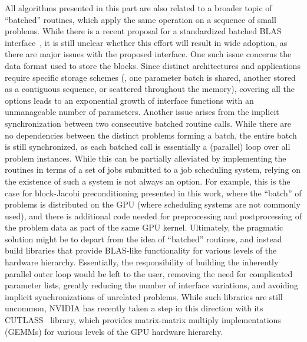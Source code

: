 All algorithms presented in this part are also related to a broader topic of
``batched'' routines, which apply the same operation on a sequence of small
problems. While there is a recent proposal for a standardized batched BLAS
interface~\cite{batched-blas}, it is still unclear whether this effort will result in
wide adoption, as there are major issues with the proposed interface.
One such issue concerns the data format used to store the blocks. Since distinct
architectures and applications require specific storage schemes (\eg, one
parameter batch is shared, another stored as a contiguous sequence, or scattered
throughout the memory), covering all the options leads to an exponential
growth of interface functions with an unmanageable number of parameters.
Another issue arises from the implicit synchronization between two consecutive
batched routine calls. While there are no dependencies between the distinct
problems forming a batch, the entire batch is still synchronized, as each
batched call is essentially a (parallel) loop over all problem instances. While
this can be partially alleviated by implementing the routines in terms of a set
of jobs submitted to a job scheduling system, relying on the existence of such a
system is not always an option. For example, this is the case for block-Jacobi
preconditioning presented in this work, where the ``batch'' of problems is
distributed on the GPU (where scheduling systems are not commonly used), and
there is additional code needed for preprocessing and postprocessing of the
problem data as part of the same GPU kernel. Ultimately, the pragmatic solution
might be to depart from the idea of ``batched'' routines, and instead build
libraries that provide BLAS-like functionality for various levels of the
hardware hierarchy.  Essentially, the responsibility of building the inherently
parallel outer loop would be left to the user, removing the need for complicated
parameter lists, greatly reducing the number of interface variations, and
avoiding implicit synchronizations of unrelated problems. While such libraries
are still uncommon, NVIDIA has recently taken a step in this direction with its
CUTLASS~\cite{cutlass} library, which provides matrix-matrix multiply
implementations (GEMMs) for various levels of the GPU hardware hierarchy.

